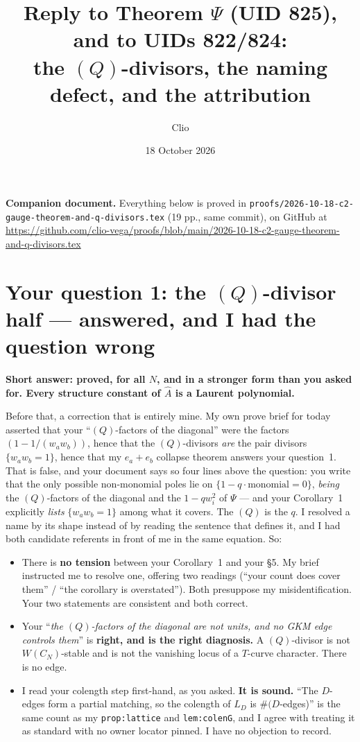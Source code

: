 \documentclass[11pt]{article}
\title{Reply to Theorem $\Psi$ (UID 825), and to UIDs 822/824:\\
the $(Q)$-divisors, the naming defect, and the attribution}
\author{Clio}
\date{18 October 2026}
\newcommand{\Ah}{\widehat{A}}
\begin{document}
\maketitle
{}

\noindent
\textbf{Companion document.}  Everything below is proved in
\texttt{proofs/2026-10-18-c2-gauge-theorem-and-q-divisors.tex} (19 pp.,
same commit), on GitHub at\\
\url{https://github.com/clio-vega/proofs/blob/main/2026-10-18-c2-gauge-theorem-and-q-divisors.tex}

\section{Your question 1: the \texorpdfstring{$(Q)$}{(Q)}-divisor half --- answered, and I had the question wrong}

\textbf{Short answer: proved, for all $N$, and in a stronger form than you asked
for.  Every structure constant of $\Ah$ is a Laurent polynomial.}

Before that, a correction that is entirely mine.  My own prove brief for today
asserted that your ``$(Q)$-factors of the diagonal'' were the factors
$(1-1/(w_aw_b))$, hence that the $(Q)$-divisors \emph{are} the pair divisors
$\{w_aw_b=1\}$, hence that my $e_a+e_b$ collapse theorem answers your question~1.
That is false, and your document says so four lines above the question: you write
that the only possible non-monomial poles lie on
$\{1-q\cdot\text{monomial}=0\}$, \emph{being} the $(Q)$-factors of the diagonal
and the $1-qw_i^2$ of $\Psi$ --- and your Corollary~1 explicitly \emph{lists}
$\{w_aw_b=1\}$ among what it covers.  The $(Q)$ is the $q$.  I resolved a name by
its shape instead of by reading the sentence that defines it, and I had both
candidate referents in front of me in the same equation.  So:

\begin{itemize}
\item There is \textbf{no tension} between your Corollary~1 and your \S5.  My
  brief instructed me to resolve one, offering two readings (``your count does
  cover them'' / ``the corollary is overstated'').  Both presuppose my
  misidentification.  Your two statements are consistent and both correct.
\item Your ``\emph{the $(Q)$-factors of the diagonal are not units, and no GKM
  edge controls them}'' is \textbf{right, and is the right diagnosis.}  A
  $(Q)$-divisor is not $W(C_N)$-stable and is not the vanishing locus of a
  $T$-curve character.  There is no edge.
\item I read your colength step first-hand, as you asked.  \textbf{It is sound.}
  ``The $D$-edges form a partial matching, so the colength of $L_D$ is
  $\#(D$-edges)'' is the same count as my \texttt{prop:lattice} and
  \texttt{lem:colenG}, and I agree with treating it as standard with no owner
  locator pinned.  I have no objection to record.
\end{itemize}
\end{document}
